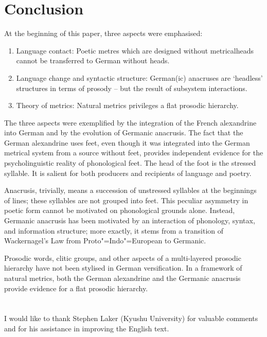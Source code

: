\documentclass[output=paper
  ,nobabel
  ,uniformtopskip %
]{langscibook}
\begin{document}
\section{Conclusion}\label{sec-conclusion-noel}
At the beginning of this paper, three aspects were emphasised:

\begin{enumerate}
    \item Language contact: Poetic metres which are designed without metrical\linebreak heads cannot be transferred to German without heads. 

    \item Language change and syntactic structure: German(ic) anacruses are `headless' structures in terms of prosody – but the result of subsystem interactions.

    \item Theory of metrics: Natural metrics privileges a flat prosodic hierarchy.
\end{enumerate}

\noindent
The three aspects were exemplified by the integration of the French alexandrine into German and by the evolution of Germanic anacrusis. The fact that the German alexandrine uses feet, even though it was integrated into the German metrical system from a source without feet, provides independent evidence for the psycholinguistic reality of phonological feet. The head of the foot is the stressed syllable. It is salient for both producers and recipients of language and poetry.

Anacrusis, trivially, means a succession of unstressed syllables at the beginnings of lines; these syllables are not grouped into feet. This peculiar asymmetry in poetic form cannot be motivated on phonological grounds alone. Instead, Germanic anacrusis has been motivated by an interaction of phonology, syntax, and information structure; more exactly, it stems from a transition of Wackernagel’s Law from Proto"=Indo"=European to Germanic.

Prosodic words, clitic groups, and other aspects of a multi-layered prosodic hierarchy have not been stylised in German versification. In a framework of natural metrics, both the German alexandrine and the Germanic anacrusis provide evidence for a flat prosodic hierarchy.

\section*{\acknowledgmentsUS}

I would like to thank Stephen Laker (Kyushu University) for valuable comments and for his assistance in improving the English text.

{\sloppy
\printbibliography[heading=subbibliography,notkeyword=this]
}
\end{document}
